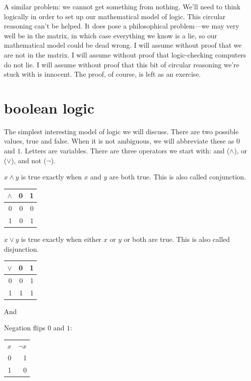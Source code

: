 \documentclass{scrbook}
\begin{document}
A similar problem: we cannot get something from nothing. We'll need to think logically in order to set up our mathematical model of logic. This circular reasoning can't be helped. It does pose a philosophical problem---we may very well be in the matrix, in which case everything we know is a lie, so our mathematical model could be dead wrong. I will assume without proof that we are not in the matrix. I will assume without proof that logic-checking computers do not lie. I will assume without proof that this bit of circular reasoning we're stuck with is innocent. The proof, of course, is left as an exercise. 
\chapter[Boolean Logic]{boolean logic}
The simplest interesting model of logic we will discuss. There are two possible values, true and false. When it is not ambiguous, we will abbreviate these as $0$ and $1$. Letters are variables. There are three operators we start with: and ($\wedge$), or ($\vee$), and not ($\neg$). 
\begin{defn}
  \label{def:bool:and}
  $x \wedge y$ is true exactly when $x$ and $y$ are both true. This is also called conjunction.
  \begin{center}
    \begin{tabular}{r|rr}
      $\wedge$ & 0 & 1 \\
      \hline
      0 & 0 & 0 \\
      1 & 0 & 1 
    \end{tabular}
  \end{center}
\end{defn}

\begin{defn}[or $\vee$]
  \label{def:bool:or}
  $x \vee y$ is true exactly when either $x$ or $y$ or both are true. This is also called disjunction.
  \begin{center}
\begin{tabular}{r|rr}
$\vee$ & 0 & 1 \\
  \hline
0 & 0 & 1 \\
1 & 1 & 1 
\end{tabular}
\end{center}
\end{defn}
And
\begin{defn}
Negation flips $0$ and $1$:
  \begin{center}
\begin{tabular}{rr}
$x$ & $\neg x$ \\
0 & 1 \\
1 & 0 
\end{tabular}
\end{center}
\end{defn}
\end{document}
